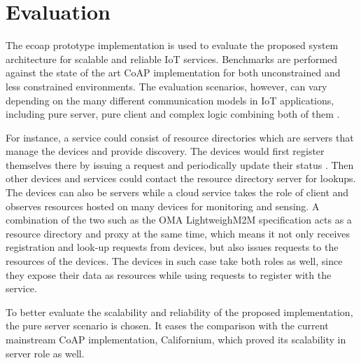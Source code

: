 \chapter{Evaluation}\label{ch5}

The ecoap prototype implementation is used to evaluate the proposed system architecture for scalable and reliable IoT services. Benchmarks are performed against the state of the art CoAP implementation for both unconstrained and less constrained environments. The evaluation scenarios, however, can vary depending on the many different communication models in IoT applications, including pure server, pure client and complex logic combining both of them \cite{kovatsch2015scalable}. 

For instance, a service could consist of resource directories which are servers that manage the devices and provide discovery. The devices would first register themselves there by issuing a request and periodically update their status \cite{core_directory}. Then other devices and services could contact the resource directory server for lookups. The devices can also be servers while a cloud service takes the role of client and observes resources hosted on many devices for monitoring and sensing. A combination of the two such as the OMA LightweighM2M \cite{lwm2m} specification acts as a resource directory and proxy at the same time, which means it not only receives registration and look-up requests from devices, but also issues requests to the resources of the devices. The devices in such case take both roles as well, since they expose their data as resources while using requests to register with the service.

To better evaluate the scalability and reliability of the proposed implementation, the pure server scenario is chosen. It eases the comparison with the current mainstream CoAP implementation, Californium, which proved its scalability in server role as well.


